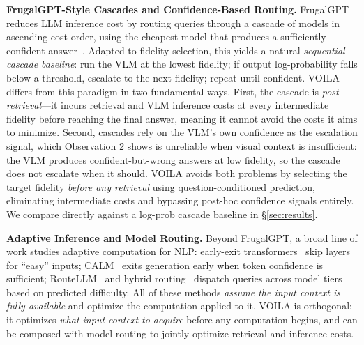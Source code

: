 \noindent\textbf{FrugalGPT-Style Cascades and Confidence-Based Routing.}
FrugalGPT~\cite{chen2023frugalgpt} reduces LLM inference cost by routing queries through a cascade of models in ascending cost order, using the cheapest model that produces a sufficiently confident answer~\cite{shnitzer2023large, wang2024routellm}.
Adapted to fidelity selection, this yields a natural \emph{sequential cascade baseline}: run the VLM at the lowest fidelity; if output log-probability falls below a threshold, escalate to the next fidelity; repeat until confident.
VOILA differs from this paradigm in two fundamental ways.
First, the cascade is \emph{post-retrieval}---it incurs retrieval and VLM inference costs at every intermediate fidelity before reaching the final answer, meaning it cannot avoid the costs it aims to minimize.
Second, cascades rely on the VLM's own confidence as the escalation signal, which Observation 2 shows is unreliable when visual context is insufficient: the VLM produces confident-but-wrong answers at low fidelity, so the cascade does not escalate when it should.
VOILA avoids both problems by selecting the target fidelity \emph{before any retrieval} using question-conditioned prediction, eliminating intermediate costs and bypassing post-hoc confidence signals entirely.
We compare directly against a log-prob cascade baseline in \S\ref{sec:results}.

\noindent\textbf{Adaptive Inference and Model Routing.}
Beyond FrugalGPT, a broad line of work studies adaptive computation for NLP: early-exit transformers~\cite{zhou2020bert, elbayad2020depth} skip layers for ``easy'' inputs; CALM~\cite{schuster2022confident} exits generation early when token confidence is sufficient; RouteLLM~\cite{wang2024routellm} and hybrid routing~\cite{ding2024hybrid} dispatch queries across model tiers based on predicted difficulty.
All of these methods \emph{assume the input context is fully available} and optimize the computation applied to it.
VOILA is orthogonal: it optimizes \emph{what input context to acquire} before any computation begins, and can be composed with model routing to jointly optimize retrieval and inference costs.

